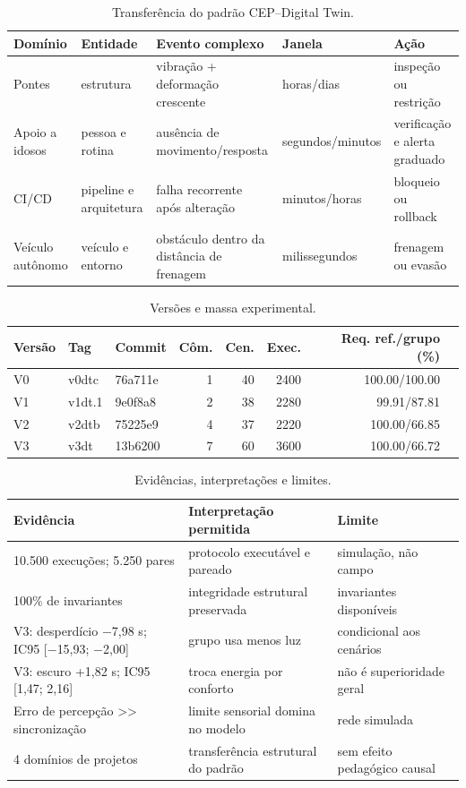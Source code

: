\begin{table}[ht]
\centering
\caption{Transferência do padrão CEP--Digital Twin.}
\small\begin{tabular}{p{1.8cm}p{2.2cm}p{4.0cm}p{1.8cm}p{3.0cm}}
\toprule
Domínio & Entidade & Evento complexo & Janela & Ação \\ \midrule
Pontes & estrutura & vibração + deformação crescente & horas/dias & inspeção ou restrição \\
Apoio a idosos & pessoa e rotina & ausência de movimento/resposta & segundos/minutos & verificação e alerta graduado \\
CI/CD & pipeline e arquitetura & falha recorrente após alteração & minutos/horas & bloqueio ou rollback \\
Veículo autônomo & veículo e entorno & obstáculo dentro da distância de frenagem & milissegundos & frenagem ou evasão \\
\bottomrule\end{tabular}
\end{table}

\begin{table}[ht]
\centering
\caption{Versões e massa experimental.}
\small\begin{tabular}{lllrrrrr}
\toprule
Versão & Tag & Commit & Côm. & Cen. & Exec. & Req. ref./grupo (\%) \\ \midrule
V0 & v0dtc & 76a711e & 1 & 40 & 2400 & 100.00/100.00 \\
V1 & v1dt.1 & 9e0f8a8 & 2 & 38 & 2280 & 99.91/87.81 \\
V2 & v2dtb & 75225e9 & 4 & 37 & 2220 & 100.00/66.85 \\
V3 & v3dt & 13b6200 & 7 & 60 & 3600 & 100.00/66.72 \\
\bottomrule\end{tabular}
\end{table}

\begin{table}[ht]
\centering
\caption{Evidências, interpretações e limites.}
\small\begin{tabular}{p{4.1cm}p{4.2cm}p{4.0cm}}
\toprule
Evidência & Interpretação permitida & Limite \\ \midrule
10.500 execuções; 5.250 pares & protocolo executável e pareado & simulação, não campo \\
100\% de invariantes & integridade estrutural preservada & invariantes disponíveis \\
V3: desperdício $-$7,98 s; IC95 [$-$15,93; $-$2,00] & grupo usa menos luz & condicional aos cenários \\
V3: escuro +1,82 s; IC95 [1,47; 2,16] & troca energia por conforto & não é superioridade geral \\
Erro de percepção >> sincronização & limite sensorial domina no modelo & rede simulada \\
4 domínios de projetos & transferência estrutural do padrão & sem efeito pedagógico causal \\
\bottomrule\end{tabular}
\end{table}
